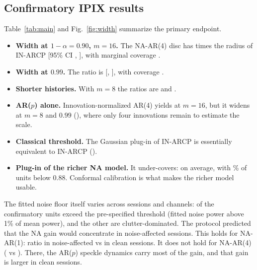 \subsection{Confirmatory IPIX results}
Table~\ref{tab:main} and Fig.~\ref{fig:width} summarize the primary endpoint.
\begin{itemize}[leftmargin=*,itemsep=1pt]
\item \textbf{Width at $1-\alpha=0.90$, $m=16$.} The NA-AR(4) disc has \RatioNAFourmSixteenA{} times the radius of IN-ARCP [95\% CI \RatioLoNAFourmSixteenA, \RatioHiNAFourmSixteenA], with marginal coverage \CovNAFourmSixteenA.
\item \textbf{Width at $0.99$.} The ratio is \RatioNAFourmSixteenB{} [\RatioLoNAFourmSixteenB, \RatioHiNAFourmSixteenB], with coverage \CovNAFourmSixteenB.
\item \textbf{Shorter histories.} With $m=8$ the ratios are \RatioNAFourmEightA{} and \RatioNAFourmEightB.
\item \textbf{AR($p$) alone.} Innovation-normalized AR(4) yields \RatioINFourmSixteenA{} at $m=16$, but it widens at $m=8$ and $0.99$ (\RatioINFourmEightB), where only four innovations remain to estimate the scale.
\item \textbf{Classical threshold.} The Gaussian plug-in of IN-ARCP is essentially equivalent to IN-ARCP (\RatioGOnemSixteenA).
\item \textbf{Plug-in of the richer NA model.} It under-covers: \CovNAFourGmSixteenA{} on average, with \BelowNAFourGmSixteenA\% of units below 0.88. Conformal calibration is what makes the richer model usable.
\end{itemize}

The fitted noise floor itself varies across sessions and channels: \NNoisyConf{} of the \NUnitsConf{} confirmatory units exceed the pre-specified threshold (fitted noise power above 1\% of mean power), and the other \NCleanConf{} are clutter-dominated. The protocol predicted that the NA gain would concentrate in noise-affected sessions. This holds for NA-AR(1): ratio \NoisyNAOnemSixteenA{} in noise-affected vs \CleanNAOnemSixteenA{} in clean sessions. It does not hold for NA-AR(4) (\NoisyNAFourmSixteenA{} vs \CleanNAFourmSixteenA). There, the AR($p$) speckle dynamics carry most of the gain, and that gain is larger in clean sessions.

